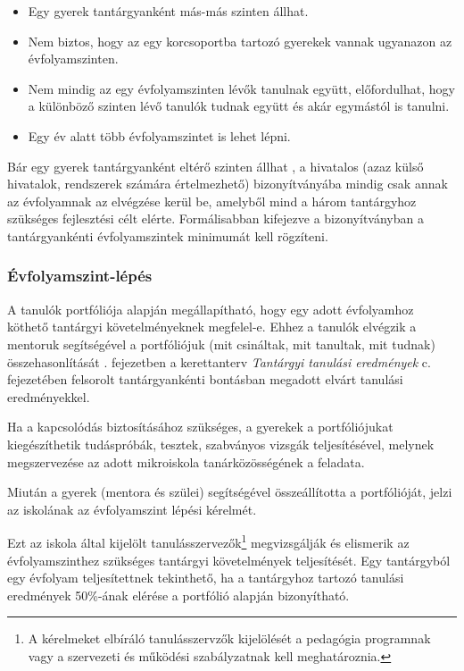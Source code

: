 \begin{itemize}
      \item Egy gyerek tantárgyanként más-más szinten állhat.
      \item Nem biztos, hogy az egy korcsoportba tartozó gyerekek vannak
            ugyanazon az évfolyamszinten.

      \item Nem mindig az egy évfolyamszinten lévők tanulnak együtt,
            előfordulhat, hogy a különböző szinten lévő tanulók tudnak együtt
            és akár
            egymástól is tanulni.

      \item Egy év alatt több évfolyamszintet is lehet lépni.
\end{itemize}

Bár egy gyerek tantárgyanként eltérő szinten állhat , a hivatalos (azaz külső
hivatalok, rendszerek számára értelmezhető) bizonyítványába mindig csak annak
az évfolyamnak az elvégzése kerül be, amelyből mind a három tantárgyhoz
szükséges fejlesztési célt elérte. Formálisabban kifejezve a bizonyítványban a
tantárgyankénti évfolyamszintek minimumát kell rögzíteni.

\subsubsection{Évfolyamszint-lépés}
\label{sec:evfolyamszintlepes}
A tanulók portfóliója alapján megállapítható, hogy egy adott évfolyamhoz
köthető tantárgyi követelményeknek megfelel-e.
Ehhez a tanulók elvégzik a mentoruk segítségével a portfóliójuk (mit csináltak,
mit tanultak, mit tudnak) összehasonlítását \ifkerettanterv
      .
      fejezetben
\else
      a kerettanterv \emph{Tantárgyi tanulási eredmények} c. fejezetében
\fi
felsorolt tantárgyankénti bontásban megadott elvárt tanulási eredményekkel.

Ha a kapcsolódás biztosításához szükséges, a gyerekek a portfóliójukat
kiegészíthetik tudáspróbák, tesztek, szabványos vizsgák teljesítésével, melynek
megszervezése az adott mikroiskola tanárközösségének a feladata.

Miután a gyerek (mentora és szülei) segítségével összeállította a portfólióját,
jelzi az iskolának az évfolyamszint lépési kérelmét.

Ezt az iskola által kijelölt tanulásszervezők\footnote{A kérelmeket elbíráló
      tanulásszervzők kijelölését a pedagógia programnak vagy a szervezeti és
      működési szabályzatnak kell meghatároznia.}  
megvizsgálják és elismerik az
évfolyamszinthez szükséges tantárgyi követelmények teljesítését.
Egy tantárgyból egy évfolyam teljesítettnek tekinthető, ha a tantárgyhoz
tartozó tanulási eredmények 50\%-ának elérése a portfólió alapján bizonyítható.

